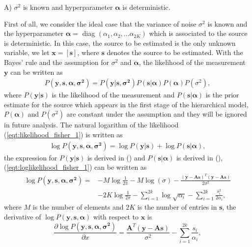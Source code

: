 \documentclass[proposal]{umthesis}          %
\begin{document}
\noindent
A) $\sigma^{2}$ is known and hyperparameter $\mathbf{\alpha}$ is deterministic.

\noindent
First of all, we consider the ideal case that the variance of noise $\sigma^{2}$ is known and the hyperparameter $\mathbf{\boldsymbol{\alpha}} = $ diag $(\alpha_{1}, \alpha_{2}, ... \alpha_{2K})$ which is associated to the source is deterministic. In this case, the source to be estimated is the only unknown variable, we let $\mathbf{x} = [\mathbf{s}]$, where $\mathbf{s}$ denotes the source to be estimated.
With the Bayes' rule and the assumption for $\sigma^{2}$ and $\mathbf{\boldsymbol{\alpha}}$, the likelihood of the measurement $\mathbf{y}$ can be written as 
\begin{align} \label{eqt:likelihood_fisher_1}
P(\mathbf{y,s,\boldsymbol{\alpha}, \sigma^{2}}) = P(\mathbf{y|s,\sigma^{2}})P(\mathbf{s|\boldsymbol{\alpha}})P(\mathbf{\boldsymbol{\alpha}})P(\sigma^{2}),
\end{align}   
where $P(\mathbf{y|s})$ is the likelihood of the measurement and $P(\mathbf{s|\boldsymbol{\alpha}})$ is the prior estimate for the source which appears in the first stage of the hierarchical model, $P(\mathbf{\boldsymbol{\alpha}})$ and $P(\sigma^{2})$ are constant under the assumption and they will be ignored in future analysis.
The natural logarithm of the likelihood (\ref{eqt:likelihood_fisher_1}) is written as 
\begin{align} \label{eqt:loglikelihood_fisher_1}
\log P(\mathbf{y,s,\alpha, \sigma^{2}}) = \log P(\mathbf{y|s})+ \log P(\mathbf{s|\boldsymbol{\alpha}}),
\end{align} 
the expression for $P(\mathbf{y|s})$ is derived in () and $P(\mathbf{s|\boldsymbol{\alpha}})$ is derived in (), (\ref{eqt:loglikelihood_fisher_1}) can be written as 
\begin{equation}
\begin{aligned} \label{eqt:loglikelihood_expansion__fisher_1}
\log P(\mathbf{y,s,\alpha, \sigma^{2}})  = & -M \log \frac{1}{2\pi} - M \log(\sigma)
 - \frac{(\mathbf{y-As})^{T}(\mathbf{y-As})}{2\sigma^{2}} \\
 & - 2K \log \frac{1}{2\pi} - \sum_{i=1}^{2k}\log \sqrt{\alpha_{i}} - \sum_{i=1}^{2k}\frac{s_{i}^{2}}{2\alpha_{i}},
\end{aligned}
\end{equation}
where $M$ is the number of elements and $2K$ is the number of entries in $\mathbf{s}$, the derivative of $\log P(\mathbf{y,s,\alpha})$ with respect to $\mathbf{x}$ is
\begin{equation} \label{eqt:loglikelihood_derivative__fisher_1}
\frac{\partial \log P(\mathbf{y,s,\alpha, \sigma^{2}})}{\partial x} = \frac{\mathbf{A}^{T}(\mathbf{y-As})}{\sigma^{2}} - \sum_{i=1}^{2k}\frac{s_{i}}{\alpha_{i}},
\end{equation}
\end{document}
